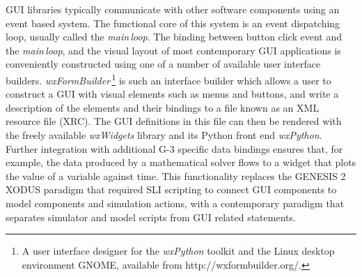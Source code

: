 \documentclass[12pt]{article}
\begin{document}
GUI libraries typically communicate with other software components
using an event based system.  The functional core of this system is an
event dispatching loop, usually called the {\it main\,loop}.
The binding between button click event and the {\it main\,loop}, and
the visual layout of most contemporary GUI applications is
conveniently constructed using one of a number of available user
interface builders.
%
%
{\it wxFormBuilder}\,\footnote{A user interface designer for the {\it
    wxPython} toolkit and the Linux desktop environment GNOME,
  available from http://wxformbuilder.org/.} is such an interface
builder which allows a user to construct a GUI with visual elements
such as menus and buttons, and write a description of the elements and
their bindings to a file known as an XML resource file (XRC).  The GUI
definitions in this file can then be rendered with the freely
available {\it wxWidgets} library and its Python front end {\it
  wxPython}.  Further integration with additional G-3 specific data
bindings ensures that, for example, the data produced by a
mathematical solver flows to a widget that plots the value of a
variable against time.  This functionality replaces the GENESIS 2
XODUS paradigm that required SLI scripting to connect GUI components
to model components and simulation actions, with a contemporary
paradigm that separates simulator and model scripts from GUI related
statements.
\end{document}
